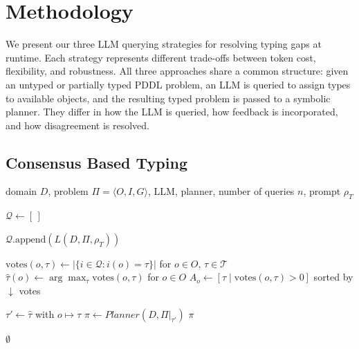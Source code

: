 \section{Methodology}

We present our three LLM querying strategies for resolving typing gaps at runtime. Each strategy represents different trade-offs between token cost, flexibility, and robustness. All three approaches share a common structure: given an untyped or partially typed PDDL problem, an LLM is queried to assign types to available objects, and the resulting typed problem is passed to a symbolic planner. They differ in how the LLM is queried, how feedback is incorporated, and how disagreement is resolved.

\subsection{Consensus Based Typing}

\begin{algorithm}[t]
  \caption{CAST: Consensus Variant}
  \label{alg:consensus-typing}
  \begin{algorithmic}[1]
    \footnotesize
    \Require domain $D$, problem $\Pi=\langle O,I,G\rangle$, LLM, planner, number of queries $n$, prompt $\rho_T$
    
    \State $\mathcal{Q} \gets [ \,]$
    
      \State $\mathcal{Q}.\mathrm{append}(L(D, \Pi, \rho_T))$ 
    \EndFor
    
    \State $\mathrm{votes}(o,\tau) \gets |\{i \in \mathcal{Q} : i(o) = \tau\}|$ for $o \in O,\, \tau \in \mathcal{T}$
    \State $\hat{\tau}(o) \gets \arg\max_{\tau} \mathrm{votes}(o,\tau)$ for $o \in O$
    \State $A_o \gets [\tau \mid \mathrm{votes}(o,\tau) > 0]$ sorted by $\downarrow$ votes

       
        \State $\tau' \gets \hat{\tau}$ with $o \mapsto \tau$ 
        \State $\pi \gets Planner(D, \Pi|_{\tau'})$
        \If{$\pi \neq \emptyset$}
          \State \Return $\pi$
        \EndIf 
      \EndFor 
    \EndFor
    
    \State \Return $\emptyset$
  \end{algorithmic}
\end{algorithm}

